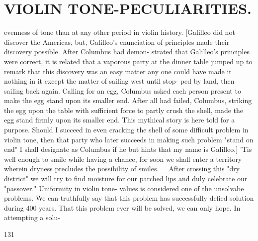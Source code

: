 \documentclass{article}
\begin{document}
\section*{VIOLIN TONE-PECULIARITIES.}
evenness of tone than at any other period in violin history. [Galilleo did not discover the Americas, but, Galilleo's enunciation of principles made their discovery possible. After Columbus had demon- strated that Galilleo's principles were correct, it is related that a vaporous party at the dinner table jumped up to remark that this discovery was an easy matter any one could have made it nothing in it except the matter of sailing west until stop- ped by land, then sailing back again. Calling for an egg, Columbus asked each person present to make the egg stand upon its smaller end. After all had failed, Columbus, striking the egg upon the table with sufficient force to partly crush the shell, made the egg stand firmly upon its smaller end. This mythical story is here told for a purpose. Should I succeed in even cracking the shell of some difficult problem in violin tone, then that party who later succeeds in making such problem "stand on end" I shall designate as Columbus if he but hints that my name is Galilleo.] 'Tis well enough to smile while having a chance, for soon we shall enter a territory wherein dryness precludes the possibility of smiles. \_ After crossing this "dry district" we will try to find moisture for our parched lips and duly celebrate our "passover." Uniformity in violin tone- values is considered one of the unsolvabe problems. We can truthfully say that this problem has successfully defied solution during 400 years. That this problem ever will be solved, we can only hope. In attempting a solu-

131
\end{document}
